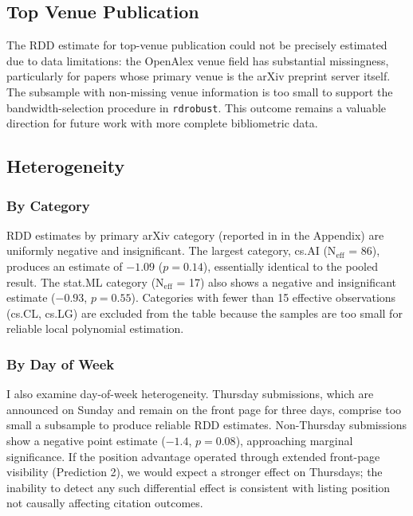 \documentclass[12pt]{article}
\begin{document}
\subsection{Top Venue Publication}

The RDD estimate for top-venue publication could not be precisely estimated due to data limitations: the OpenAlex venue field has substantial missingness, particularly for papers whose primary venue is the arXiv preprint server itself. The subsample with non-missing venue information is too small to support the bandwidth-selection procedure in \texttt{rdrobust}. This outcome remains a valuable direction for future work with more complete bibliometric data.

\subsection{Heterogeneity}

\subsubsection{By Category}

RDD estimates by primary arXiv category (reported in  in the Appendix) are uniformly negative and insignificant. The largest category, cs.AI (N$_{\text{eff}}$ = 86), produces an estimate of $-1.09$ ($p = 0.14$), essentially identical to the pooled result. The stat.ML category (N$_{\text{eff}}$ = 17) also shows a negative and insignificant estimate ($-0.93$, $p = 0.55$). Categories with fewer than 15 effective observations (cs.CL, cs.LG) are excluded from the table because the samples are too small for reliable local polynomial estimation.

\subsubsection{By Day of Week}

I also examine day-of-week heterogeneity. Thursday submissions, which are announced on Sunday and remain on the front page for three days, comprise too small a subsample to produce reliable RDD estimates. Non-Thursday submissions show a negative point estimate ($-1.4$, $p = 0.08$), approaching marginal significance. If the position advantage operated through extended front-page visibility (Prediction 2), we would expect a stronger effect on Thursdays; the inability to detect any such differential effect is consistent with listing position not causally affecting citation outcomes.
\end{document}
